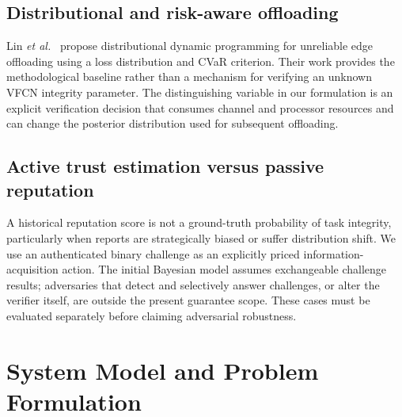 \documentclass[journal]{IEEEtran}
\begin{document}
\subsection{Distributional and risk-aware offloading}
Lin \emph{et al.}~\cite{lin2026ddp} propose distributional dynamic programming for unreliable edge offloading using a loss distribution and CVaR criterion. Their work provides the methodological baseline rather than a mechanism for verifying an unknown VFCN integrity parameter. The distinguishing variable in our formulation is an explicit verification decision that consumes channel and processor resources and can change the posterior distribution used for subsequent offloading.

\subsection{Active trust estimation versus passive reputation}
A historical reputation score is not a ground-truth probability of task integrity, particularly when reports are strategically biased or suffer distribution shift. We use an authenticated binary challenge as an explicitly priced information-acquisition action. The initial Bayesian model assumes exchangeable challenge results; adversaries that detect and selectively answer challenges, or alter the verifier itself, are outside the present guarantee scope. These cases must be evaluated separately before claiming adversarial robustness.

\section{System Model and Problem Formulation}
\end{document}
